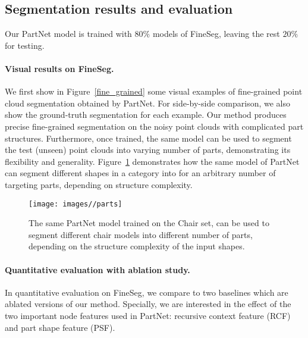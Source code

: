 \subsection{Segmentation results and evaluation}
Our PartNet model is trained with $80\%$ models of FineSeg, leaving the rest $20\%$ for testing.

\paragraph{Visual results on FineSeg.}
We first show in Figure~\ref{fine_grained} some visual examples of fine-grained point cloud segmentation obtained by PartNet. For side-by-side comparison, we also show the ground-truth segmentation for each example. Our method produces precise fine-grained segmentation on the noisy point clouds with complicated part structures. Furthermore, once trained, the same model can be used to segment the test (unseen) point clouds into varying number of parts, demonstrating its flexibility and generality.
Figure~\ref{fig:parts} demonstrates how the same model of PartNet can segment different shapes in a category into for an arbitrary number of targeting parts, depending on structure complexity.

\begin{figure}[t]
  \centering
  \texttt{[image: images//parts]}
  \caption{The same PartNet model trained on the Chair set, can be used to segment different chair models into different number of parts, depending on the structure complexity of the input shapes.}
  \label{fig:parts}\vspace{-10pt}
\end{figure}


\paragraph{Quantitative evaluation with ablation study.}\label{ablation study}
In quantitative evaluation on FineSeg, we compare to two baselines which are ablated versions of our method. Specially, we are interested in the effect of the two important node features used in PartNet: recursive context feature (RCF) and part shape feature (PSF).





